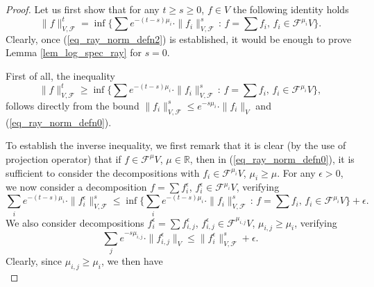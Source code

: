 \documentclass[12pt]{article}
\numberwithin{equation}{section}
\theoremstyle{theorem}
\theoremstyle{definition}
\theoremstyle{remark}
\newcommand{\real}{\mathbb{R}}
\begin{document}
	\begin{proof}
		Let us first show that for any $t \geq s \geq 0$, $f \in V$ the following identity holds
		\begin{equation}\label{eq_ray_norm_defn2}
			\| f \|_{V, \mathcal{F}}^t =
			\inf 
			\Big\{
				\sum
				e^{- (t - s) \mu_i} \cdot 
				\| f_i \|_{V, \mathcal{F}}^s
				\,
				:
				\,
				f = \sum f_i, \, f_i \in \mathcal{F}^{\mu_i} V
			\Big\}.
		\end{equation}
		Clearly, once (\ref{eq_ray_norm_defn2}) is established, it would be enough to prove Lemma \ref{lem_log_spec_ray} for $s = 0$.
		\par 
		First of all, the inequality 
		\begin{equation}\label{eq_ray_norm_defn2aa1}
			\| f \|_{V, \mathcal{F}}^t \geq
			\inf 
			\Big\{
				\sum
				e^{- (t - s) \mu_i} \cdot 
				\| f_i \|_{V, \mathcal{F}}^s
				\,
				:
				\,
				f = \sum f_i, \, f_i \in \mathcal{F}^{\mu_i} V
			\Big\},
		\end{equation}
		follows directly from the bound $\| f_i \|_{V, \mathcal{F}}^s \leq e^{- s \mu_i} \cdot \| f_i \|_V$ and (\ref{eq_ray_norm_defn0}).
		\par 
		To establish the inverse inequality, we first remark that it is clear (by the use of projection operator) that if $f  \in \mathcal{F}^{\mu} V$, $\mu \in \real$, then in (\ref{eq_ray_norm_defn0}), it is sufficient to consider the decompositions with $f_i \in \mathcal{F}^{\mu_i} V$, $\mu_i \geq \mu$.
		For any $\epsilon > 0$, we now consider a decomposition $f = \sum f_i^{\epsilon}$, $f_i^{\epsilon} \in \mathcal{F}^{\mu_i} V$, verifying
		\begin{equation}
			\sum_{i}
				e^{- (t - s) \mu_i} \cdot 
				\| f_i^{\epsilon} \|_{V, \mathcal{F}}^s
			\leq
			\inf 
			\Big\{
				\sum_{i}
				e^{- (t - s) \mu_i} \cdot 
				\| f_i \|_{V, \mathcal{F}}^s
				\,
				:
				\,
				f = \sum f_i, \, f_i \in \mathcal{F}^{\mu_i} V
			\Big\}
			+
			\epsilon.
		\end{equation}
		We also consider decompositions $f_i^{\epsilon} = \sum f_{i, j}^{\epsilon}$, $f_{i, j}^{\epsilon} \in \mathcal{F}^{\mu_{i, j}} V$, $\mu_{i, j} \geq \mu_i$, verifying 
		\begin{equation}
			\sum_{j}
				e^{- s \mu_{i, j}} \cdot 
				\| f_{i, j}^{\epsilon} \|_V
			\leq
			\| f_i^{\epsilon} \|_{V, \mathcal{F}}^s
			+
			\epsilon.
		\end{equation}
		Clearly, since $\mu_{i, j} \geq \mu_i$, we then have
		\begin{equation}

\end{equation}
\end{proof}
\end{document}
